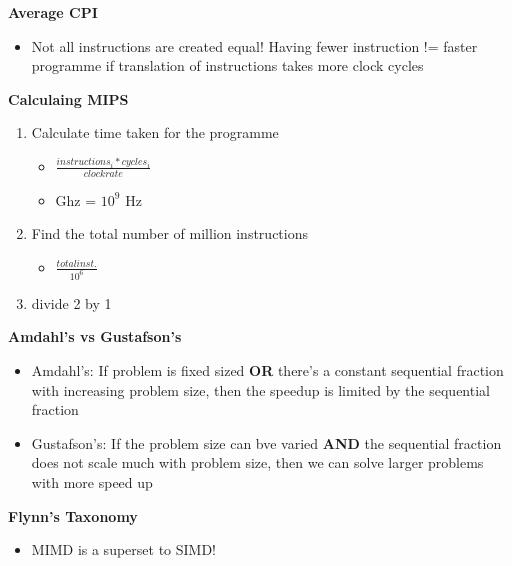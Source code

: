 \documentclass[10pt, landscape]{article}
\begin{document}
\begin{multicols}{4}
\textbf{Average CPI}
\begin{itemize}
    \item Not all instructions are created equal! Having fewer instruction != faster programme if translation of instructions takes more clock cycles
\end{itemize}

\textbf{Calculaing MIPS}
\begin{enumerate}
    \item Calculate time taken for the programme
    \begin{itemize}
        \item $\frac{instructions_i * cycles_i}{clock rate}$
        \item Ghz = $10^9$ Hz
    \end{itemize}
    \item Find the total number of million instructions 
    \begin{itemize}
        \item $\frac{total inst.}{10^6}$
    \end{itemize}
    \item divide 2 by 1
\end{enumerate}

\textbf{Amdahl's vs Gustafson's}
\begin{itemize}
    \item Amdahl's: If problem is fixed sized \textbf{OR} there's a constant sequential fraction with increasing problem size, then the speedup is limited by the sequential fraction
    \item Gustafson's: If the problem size can bve varied \textbf{AND} the sequential fraction does not scale much with problem size, then we can solve larger problems with more speed up
\end{itemize}

\textbf{Flynn's Taxonomy}
\begin{itemize}
    \item MIMD is a superset to SIMD!
\end{itemize}


\end{multicols}
\end{document}
